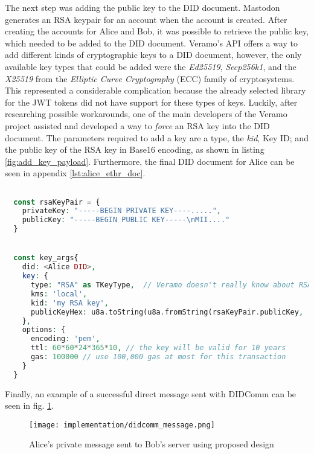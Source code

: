 The next step was adding the public key to the DID document. Mastodon generates an RSA keypair for an account when the account is created. After creating the accounts for Alice and Bob, it was possible to retrieve the public key, which needed to be added to the DID document. Veramo's API offers a way to add different kinds of cryptographic keys to a DID document, however, the only available key types that could be added were the \emph{Ed25519}, \emph{Secp256k1}, and the  \emph{X25519} from the \emph{Elliptic Curve Cryptography} (ECC) family of cryptosystems. This represented a considerable complication because the already selected library for the JWT tokens did not have support for these types of keys. Luckily, after researching possible workarounds, one of the main developers of the Veramo project assisted and developed a way to \emph{force} an RSA key into the DID document. The parameters required to add a key are a type, the \emph{kid}, Key ID; and the public key of the RSA key in Base16 encoding, as shown in listing \ref{fig:add_key_payload}. Furthermore, the final DID document for Alice can be seen in appendix \ref{lst:alice_ethr_doc}. 

\lstset{style=JSONStyle}
\begin{lstlisting}[language=PHP, caption=Adding an RSA key using Veramo, label=fig:add_key_payload, float=h]

  const rsaKeyPair = {
    privateKey: "-----BEGIN PRIVATE KEY----.....",
    publicKey: "-----BEGIN PUBLIC KEY-----\nMII...."
  }


  const key_args{
    did: <Alice DID>,
    key: {
      type: "RSA" as TKeyType,  // Veramo doesn't really know about RSA keys, but it doesn't matter in this case if we coerce it.
      kms: 'local',
      kid: 'my RSA key',
      publicKeyHex: u8a.toString(u8a.fromString(rsaKeyPair.publicKey, 'utf-8'), 'base16')
    },
    options: {
      encoding: 'pem',
      ttl: 60*60*24*365*10, // the key will be valid for 10 years
      gas: 100000 // use 100,000 gas at most for this transaction
    }
  }

\end{lstlisting}


Finally, an example of a successful direct message sent with DIDComm can be seen in fig. \ref{fig:didcomm_message}.

\begin{figure}[H]
  \centering
  \texttt{[image: implementation/didcomm\_message.png]}
  \caption{Alice's private message sent to Bob's server using proposed design}
  \label{fig:didcomm_message}
\end{figure}


